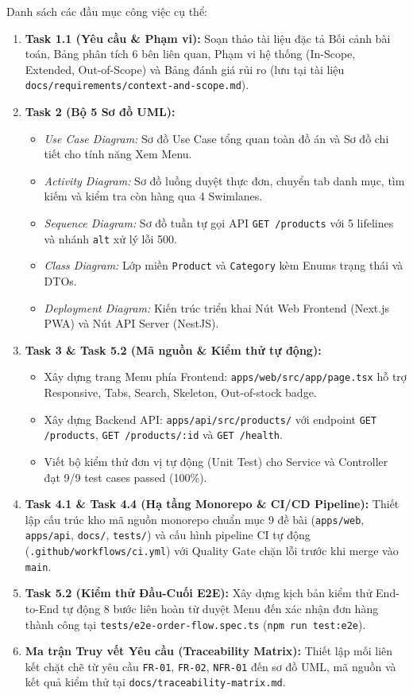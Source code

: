 \documentclass[a4paper]{article}
\begin{document}
Danh sách các đầu mục công việc cụ thể:
\begin{enumerate}
    \item \textbf{Task 1.1 (Yêu cầu \& Phạm vi):} Soạn thảo tài liệu đặc tả Bối cảnh bài toán, Bảng phân tích 6 bên liên quan, Phạm vi hệ thống (In-Scope, Extended, Out-of-Scope) và Bảng đánh giá rủi ro (lưu tại tài liệu \nolinkurl{docs/requirements/context-and-scope.md}).
    \item \textbf{Task 2 (Bộ 5 Sơ đồ UML):}
    \begin{itemize}
        \item \textit{Use Case Diagram:} Sơ đồ Use Case tổng quan toàn đồ án và Sơ đồ chi tiết cho tính năng Xem Menu.
        \item \textit{Activity Diagram:} Sơ đồ luồng duyệt thực đơn, chuyển tab danh mục, tìm kiếm và kiểm tra còn hàng qua 4 Swimlanes.
        \item \textit{Sequence Diagram:} Sơ đồ tuần tự gọi API \texttt{GET /products} với 5 lifelines và nhánh \texttt{alt} xử lý lỗi 500.
        \item \textit{Class Diagram:} Lớp miền \texttt{Product} và \texttt{Category} kèm Enums trạng thái và DTOs.
        \item \textit{Deployment Diagram:} Kiến trúc triển khai Nút Web Frontend (Next.js PWA) và Nút API Server (NestJS).
    \end{itemize}
    \item \textbf{Task 3 \& Task 5.2 (Mã nguồn \& Kiểm thử tự động):}
    \begin{itemize}
        \item Xây dựng trang Menu phía Frontend: \nolinkurl{apps/web/src/app/page.tsx} hỗ trợ Responsive, Tabs, Search, Skeleton, Out-of-stock badge.
        \item Xây dựng Backend API: \nolinkurl{apps/api/src/products/} với endpoint \texttt{GET /products}, \texttt{GET /products/:id} và \texttt{GET /health}.
        \item Viết bộ kiểm thử đơn vị tự động (Unit Test) cho Service và Controller đạt 9/9 test cases passed (100\%).
    \end{itemize}
    \item \textbf{Task 4.1 \& Task 4.4 (Hạ tầng Monorepo \& CI/CD Pipeline):} Thiết lập cấu trúc kho mã nguồn monorepo chuẩn mục 9 đề bài (\nolinkurl{apps/web}, \nolinkurl{apps/api}, \nolinkurl{docs/}, \nolinkurl{tests/}) và cấu hình pipeline CI tự động (\nolinkurl{.github/workflows/ci.yml}) với Quality Gate chặn lỗi trước khi merge vào \texttt{main}.
    \item \textbf{Task 5.2 (Kiểm thử Đầu-Cuối E2E):} Xây dựng kịch bản kiểm thử End-to-End tự động 8 bước liên hoàn từ duyệt Menu đến xác nhận đơn hàng thành công tại \nolinkurl{tests/e2e-order-flow.spec.ts} (\texttt{npm run test:e2e}).
    \item \textbf{Ma trận Truy vết Yêu cầu (Traceability Matrix):} Thiết lập mối liên kết chặt chẽ từ yêu cầu \texttt{FR-01}, \texttt{FR-02}, \texttt{NFR-01} đến sơ đồ UML, mã nguồn và kết quả kiểm thử tại \nolinkurl{docs/traceability-matrix.md}.
\end{enumerate}
\end{document}
